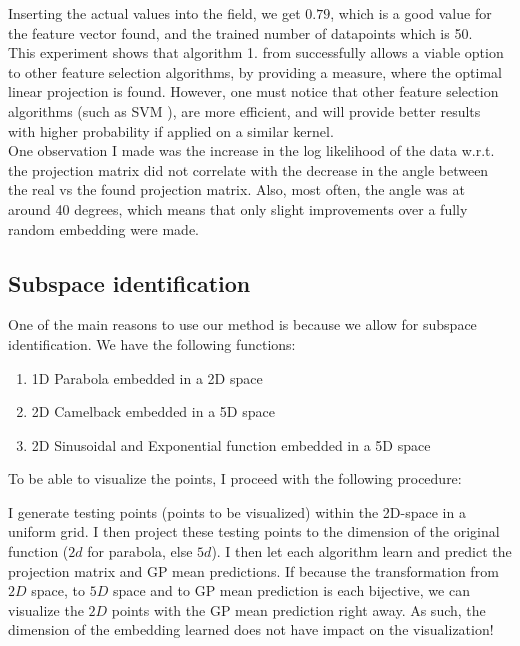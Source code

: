 Inserting the actual values into the field, we get $0.79$, which is a good value for the feature vector found, and the trained number of datapoints which is 50. \\
 
 This experiment shows that algorithm 1. from \citep{Tripathy} successfully allows a viable option to other feature selection algorithms, by providing a measure, where the optimal linear projection is found. 
 However, one must notice that other feature selection algorithms (such as SVM \citep{SVMFeature}), are more efficient, and will provide better results with higher probability if applied on a similar kernel. \\
 
 One observation I made was the increase in the log likelihood of the data w.r.t. the projection matrix did not correlate with the decrease in the angle between the real vs the found projection matrix.
 Also, most often, the angle was at around 40 degrees, which means that only slight improvements over a fully random embedding were made.


\subsection{Subspace identification}
One of the main reasons to use our method is because we allow for subspace identification.
We have the following functions:

\begin{enumerate}
\item 1D Parabola embedded in a 2D space
\item 2D Camelback embedded in a 5D space
\item 2D Sinusoidal and Exponential function embedded in a 5D space
\end{enumerate}

To be able to visualize the points, I proceed with the following procedure:

I generate testing points (points to be visualized) within the 2D-space in a uniform grid.
I then project these testing points to the dimension of the original function ($2d$ for parabola, else $5d$).
I then let each algorithm learn and predict the projection matrix and GP mean predictions.
If because the transformation from $2D$ space, to $5D$ space and to GP mean prediction is each bijective, we can visualize the $2D$ points with the GP mean prediction right away.
As such, the dimension of the embedding learned does not have impact on the visualization!

